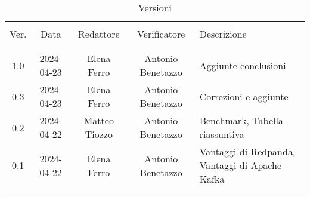\documentclass[italian,12pt]{article}
\begin{document}

\newpage


\begin{table}[!h]
	\caption*{Versioni}
	\begin{center}
		\begin{tabular}{ c c c c p{6.1cm} }
			\hline                                                                                                 \\[-2ex]
			Ver. & Data       & Redattore     & Verificatore      & Descrizione                                    \\
			\\[-2ex] \hline \\[-1.5ex]
			1.0  & 2024-04-23 & Elena Ferro   & Antonio Benetazzo & Aggiunte conclusioni                           \\
			0.3  & 2024-04-23 & Elena Ferro   & Antonio Benetazzo & Correzioni e aggiunte                          \\
			0.2  & 2024-04-22 & Matteo Tiozzo & Antonio Benetazzo & Benchmark, Tabella riassuntiva                 \\
			0.1  & 2024-04-22 & Elena Ferro   & Antonio Benetazzo & Vantaggi di Redpanda, Vantaggi di Apache Kafka \\
			\\[-1.5ex] \hline
		\end{tabular}
	\end{center}
\end{table}

\newpage
\tableofcontents
\listoftables
\listoffigures
\newpage












\end{document}
